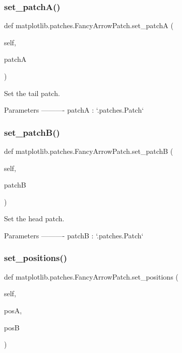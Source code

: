 \subsubsection{\texorpdfstring{set\+\_\+patch\+A()}{set\_patchA()}}
{\footnotesize\ttfamily def matplotlib.\+patches.\+Fancy\+Arrow\+Patch.\+set\+\_\+patchA (\begin{DoxyParamCaption}\item[{}]{self,  }\item[{}]{patchA }\end{DoxyParamCaption})}

\begin{DoxyVerb}Set the tail patch.

Parameters
----------
patchA : `.patches.Patch`
\end{DoxyVerb}
 \mbox{\label{classmatplotlib_1_1patches_1_1FancyArrowPatch_a6d55e01a789938f6723e24dcbe124895}} 
\subsubsection{\texorpdfstring{set\+\_\+patch\+B()}{set\_patchB()}}
{\footnotesize\ttfamily def matplotlib.\+patches.\+Fancy\+Arrow\+Patch.\+set\+\_\+patchB (\begin{DoxyParamCaption}\item[{}]{self,  }\item[{}]{patchB }\end{DoxyParamCaption})}

\begin{DoxyVerb}Set the head patch.

Parameters
----------
patchB : `.patches.Patch`
\end{DoxyVerb}
 \mbox{\label{classmatplotlib_1_1patches_1_1FancyArrowPatch_a63cbfa92fcd4fab4df769e4ee70c9f6a}} 
\subsubsection{\texorpdfstring{set\+\_\+positions()}{set\_positions()}}
{\footnotesize\ttfamily def matplotlib.\+patches.\+Fancy\+Arrow\+Patch.\+set\+\_\+positions (\begin{DoxyParamCaption}\item[{}]{self,  }\item[{}]{posA,  }\item[{}]{posB }\end{DoxyParamCaption})}

